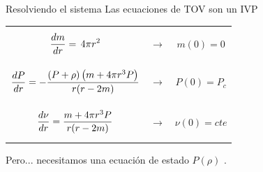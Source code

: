\documentclass[11pt]{beamer}
\begin{document}
\begin{frame}{Resolviendo el sistema}
    Las ecuaciones de TOV son un IVP
    \begin{table}[]
        \begin{tabular}{ccc}
            \parbox{3cm}{\begin{equation*}\dv{m}{r} =\, 4 \pi r ^ { 2 }\end{equation*}}       & $\longrightarrow$                     & $m(0)=0$ \\
            \parbox{5cm}{\begin{equation*}
                \dv{P}{r} = - \frac { ( P  + \rho ) \left( m  + 4 \pi r ^ { 3 } P \right) } { r ( r - 2 m ) }
            \end{equation*}}     &       $\longrightarrow$      &       $P(0)=P_c$ \\
            \parbox{4cm}{\begin{equation*}
                \dv{\nu}{r} = \frac { m  + 4 \pi r ^ { 3 } P  } { r ( r - 2 m  ) }
            \end{equation*}}  &       $\longrightarrow$      &       $\nu(0)=cte$
        \end{tabular}
    \end{table}
    \alert{Pero...} necesitamos una ecuación de estado $P(\rho)$ .
\end{frame}
\end{document}
